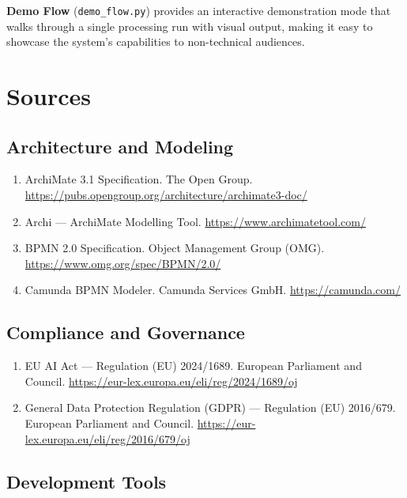 \documentclass[11pt,a4paper]{article}
\begin{document}
\textbf{Demo Flow} (\texttt{demo\_flow.py}) provides an interactive demonstration mode that walks through a single processing run with visual output, making it easy to showcase the system's capabilities to non-technical audiences.
\endgroup



\begingroup\sloppy
\section{Sources}

\subsection{Architecture and Modeling}

\begin{enumerate}[leftmargin=*, nosep]
  \item ArchiMate 3.1 Specification. The Open Group. \url{https://pubs.opengroup.org/architecture/archimate3-doc/}
  \item Archi --- ArchiMate Modelling Tool. \url{https://www.archimatetool.com/}
  \item BPMN 2.0 Specification. Object Management Group (OMG). \url{https://www.omg.org/spec/BPMN/2.0/}
  \item Camunda BPMN Modeler. Camunda Services GmbH. \url{https://camunda.com/}
\end{enumerate}

\subsection{Compliance and Governance}

\begin{enumerate}[leftmargin=*, nosep]
  \item EU AI Act --- Regulation (EU) 2024/1689. European Parliament and Council. \url{https://eur-lex.europa.eu/eli/reg/2024/1689/oj}
  \item General Data Protection Regulation (GDPR) --- Regulation (EU) 2016/679. European Parliament and Council. \url{https://eur-lex.europa.eu/eli/reg/2016/679/oj}
\end{enumerate}

\subsection{Development Tools}
\end{document}
